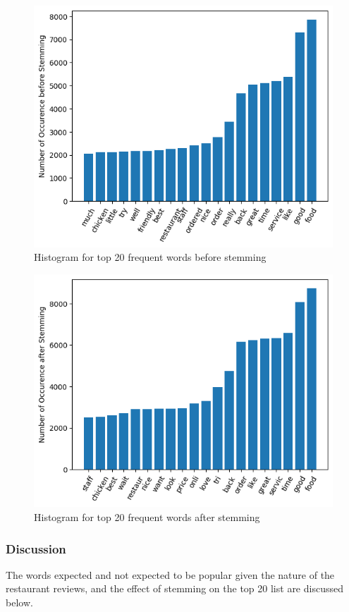\documentclass[sigconf]{acmart}
\begin{document}
\begin{figure}[ht]
  \centering
  \includegraphics[width=\linewidth]{frequent_token.png}
  \caption{Histogram for top 20 frequent words before stemming}
  \label{fig:hist_token}
\end{figure}

\begin{figure}[ht]
  \centering
  \includegraphics[width=\linewidth]{frequent_stem.png}
  \caption{Histogram for top 20 frequent words after stemming}
  \label{fig:hist_stem}
\end{figure}

\subsubsection{Discussion} The words expected and not expected to be popular given the nature of the restaurant reviews, and the effect of stemming on the top 20 list are discussed below.
\end{document}
